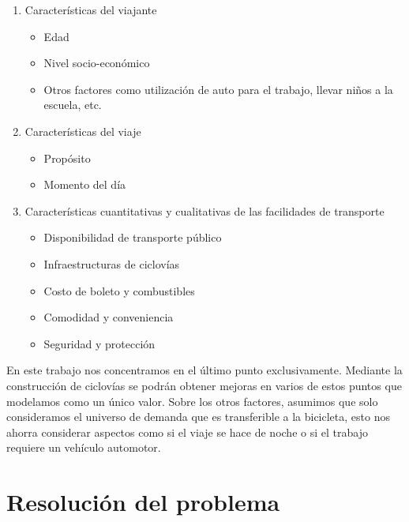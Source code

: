 \documentclass{article}
\begin{document}
  \begin{enumerate}
    \item{
        Características del viajante
          \begin{itemize}
            \item{Edad}
            \item{Nivel socio-económico}
            \item{Otros factores como utilización de auto para el trabajo, llevar niños a la escuela, etc.}
          \end{itemize}
    }
    \item{
        Características del viaje
          \begin{itemize}
            \item{Propósito}
            \item{Momento del día}
          \end{itemize}
    }
    \item{
        Características cuantitativas y cualitativas de las facilidades de transporte
        \begin{itemize}
            \item{Disponibilidad de transporte público}
            \item{Infraestructuras de ciclovías}
            \item{Costo de boleto y combustibles}
            \item{Comodidad y conveniencia}
            \item{Seguridad y protección}
        \end{itemize}
    }
  \end{enumerate}

  En este trabajo nos concentramos en el último punto exclusivamente. Mediante la construcción de ciclovías se podrán obtener mejoras en varios de estos puntos que modelamos como un único valor. Sobre los otros factores, asumimos que solo consideramos el universo de demanda que es transferible a la bicicleta, esto nos ahorra considerar aspectos como si el viaje se hace de noche o si el trabajo requiere un vehículo automotor.

  \section{Resolución del problema}
\end{document}
